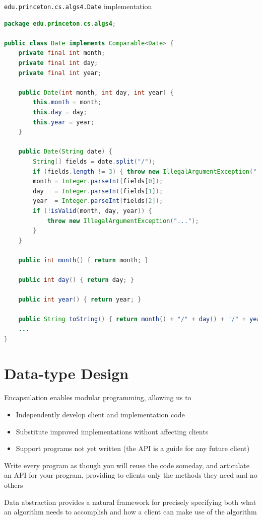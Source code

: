 \documentclass[8pt,a4paper,compress]{beamer}
\begin{document}
\begin{frame}[fragile]
\lstinline{edu.princeton.cs.algs4.Date} implementation
\begin{lstlisting}[language=Java]
package edu.princeton.cs.algs4;

public class Date implements Comparable<Date> {
    private final int month;
    private final int day;
    private final int year;
    
    public Date(int month, int day, int year) { 
        this.month = month; 
        this.day = day; 
        this.year = year; 
    }
    
    public Date(String date) {
        String[] fields = date.split("/");
        if (fields.length != 3) { throw new IllegalArgumentException("..."); }
        month = Integer.parseInt(fields[0]);
        day   = Integer.parseInt(fields[1]);
        year  = Integer.parseInt(fields[2]);
        if (!isValid(month, day, year)) {
            throw new IllegalArgumentException("...");
        }
    }
   
    public int month() { return month; }

    public int day() { return day; }

    public int year() { return year; }
    
    public String toString() { return month() + "/" + day() + "/" + year(); }
    ...
}
\end{lstlisting}
\end{frame}

\section{Data-type Design}
\begin{frame}[fragile]
Encapsulation enables modular programming, allowing us to
\begin{itemize}
\item Independently develop client and implementation code
\item Substitute improved implementations without affecting clients
\item Support programs not yet written (the API is a guide for any future client)
\end{itemize}

\bigskip

Write every program as though you will reuse the code someday, and articulate an API for your program, providing to clients only the methods they need and no others

\bigskip

Data abstraction provides a natural framework for precisely specifying both what an algorithm needs to accomplish and how a client can make use of the algorithm
\end{frame}
\end{document}
